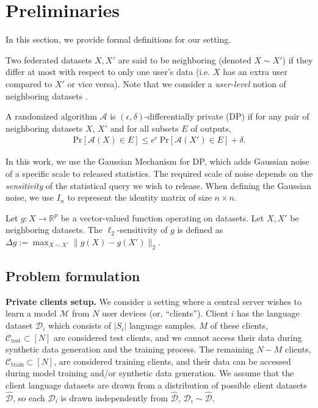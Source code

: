 
\section{Preliminaries}
In this section, we provide formal definitions for our setting.

\begin{definition}
    Two federated datasets $X, X'$ are said to be neighboring  (denoted $X\sim X'$) if they differ at most with respect to only one user's data (i.e. $X$ has an extra user compared to $X'$ or vice versa). Note that we consider a \emph{user-level} notion of neighboring datasets \citep{mcmahan2017learning}.
\end{definition}

\begin{definition}
A randomized algorithm $\mathcal{A}$ is $(\epsilon, \delta)$-differentially private (DP) if for any pair of neighboring datasets $X$, $X'$ and for all subsets $E$ of outputs, 
\begin{align}
\text{Pr}[\mathcal{A}(X) \in E] \leq e^{\epsilon}~\text{Pr}[\mathcal{A}(X') \in E] + \delta.
\end{align}
\end{definition}
In this work, we  use the Gaussian Mechanism \citep{dwork2006differential} for DP, which adds Gaussian noise of a specific scale to released statistics. 
The required scale of noise depends on the \emph{sensitivity} of the statistical query we wish to release. When defining the Gaussian noise, we use $I_n$ to represent the identity matrix of size $n \times n$.

\begin{definition}
Let $g: X \to \mathbb{R}^p$ be a vector-valued function operating on datasets.  Let $X, X'$ be neighboring datasets.  The $\ell_2$-sensitivity of $g$
is defined as 
$\Delta g := \max_{X\sim X'}\|g(X) - g(X')\|_2$.
\end{definition}


\subsection{Problem formulation}
\textbf{Private clients setup.} We consider a setting where a central server wishes to learn a model $\mathcal M$ from $N$ user devices (or, ``clients''). Client $i$ has the language dataset $\mathcal{D}_i$ which consists of $|S_i|$ language samples.  $M$ of these clients, $\mathcal{C}_{\text{test}} \subset [N]$ are considered test clients, and we cannot access their data during synthetic data generation and the training process. The remaining $N-M$ clients, $\mathcal{C}_{\text{train}} \subset [N]$, are considered training clients, and their data can be accessed during model training and/or synthetic data generation. We assume that the client language datasets are drawn from a distribution of possible client datasets $\hat{\mathcal{D}}$, so each $\mathcal{D}_i$ is drawn independently from $\hat{\mathcal{D}}$, $\mathcal{D}_i \sim \hat{\mathcal{D}}$.

